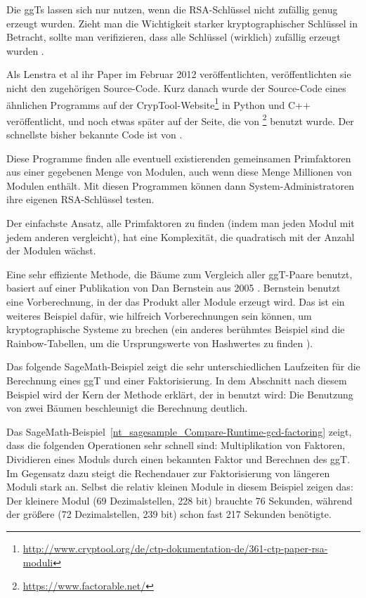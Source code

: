 \begin{refsegment}
Die ggTs lassen sich nur nutzen, wenn die RSA-Schlüssel nicht zufällig genug
erzeugt wurden. Zieht man die Wichtigkeit starker kryptographischer Schlüssel
in Betracht, sollte man verifizieren, dass alle Schlüssel (wirklich)
zufällig erzeugt wurden \cite{Esslinger2012}.

Als Lenstra et al ihr Paper \cite{Lenstra2012} im Februar 2012
veröffentlichten, veröffentlichten sie nicht den zugehörigen Source-Code.
Kurz danach wurde der Source-Code eines ähnlichen Programms auf der
CrypTool-Website\footnote{%
\url{http://www.cryptool.org/de/ctp-dokumentation-de/361-ctp-paper-rsa-moduli}
}
in Python und C++ veröffentlicht, und noch etwas später auf der Seite, die von
\cite{Heninger2012}\footnote{\url{https://www.factorable.net/}
} benutzt wurde.
Der schnellste bisher bekannte Code ist von \cite{Heninger2012}.

Diese Programme finden alle eventuell existierenden gemeinsamen Primfaktoren aus
einer gegebenen Menge von Modulen, auch wenn diese Menge Millionen von
Modulen enthält. Mit diesen Programmen können dann System-Administratoren ihre
eigenen RSA-Schlüssel testen.

Der einfachste Ansatz, alle Primfaktoren zu finden (indem man jeden Modul mit
jedem anderen vergleicht), hat eine Komplexität, die quadratisch mit der Anzahl
der Modulen wächst.

Eine sehr effiziente Methode, die Bäume zum Vergleich aller ggT-Paare benutzt,
basiert auf einer Publikation von Dan Bernstein aus 2005 \cite{Bernstein2005}. Bernstein benutzt eine Vorberechnung, in der das Produkt aller Module erzeugt wird. Das ist ein weiteres Beispiel dafür, wie hilfreich Vorberechnungen sein können, um kryptographische Systeme zu brechen (ein anderes berühmtes Beispiel sind die Rainbow-Tabellen, um die Ursprungswerte von Hashwertes zu finden \cite{Oechslin2003}).


Das folgende SageMath-Beispiel zeigt die sehr unterschiedlichen Laufzeiten für die Berechnung eines ggT und einer Faktorisierung. In dem Abschnitt nach diesem Beispiel wird der Kern der Methode erklärt, der in \cite{Heninger2012} benutzt wird: Die Benutzung von zwei Bäumen beschleunigt die Berechnung deutlich.

Das SageMath-Beispiel~\ref{nt_sagesample_Compare-Runtime-gcd-factoring} zeigt, dass die folgenden Operationen sehr schnell sind: Multiplikation von Faktoren, Dividieren eines Moduls durch einen bekannten Faktor und Berechnen des ggT. Im Gegensatz dazu steigt die Rechendauer zur Faktorisierung von längeren Moduli stark an. Selbst die relativ kleinen Module in diesem Beispiel zeigen das: Der kleinere Modul (69 Dezimalstellen, 228 bit) brauchte 76 Sekunden, während der größere (72 Dezimalstellen, 239 bit) schon fast 217 Sekunden benötigte.


\end{refsegment}
